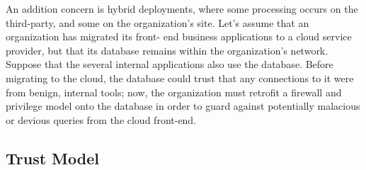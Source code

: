 An addition concern is hybrid deployments, where some processing occurs on the
third-party, and some on the organization's site.
%
Let’s assume that an organization has migrated its front- end business
applications to a cloud service provider, but that its database remains within
the organization’s network. 
%
Suppose that the several internal applications also use the database. 
%
Before migrating to the cloud, the database could trust that any connections to
it were from benign, internal tools; now, the organization must retrofit a
firewall and privilege model onto the database in order to guard against
potentially malacious or devious queries from the cloud front-end.






\subsection{Trust Model}

